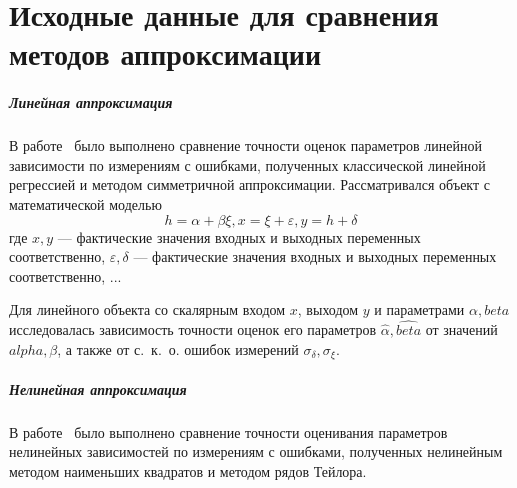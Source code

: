 \chapter{Исходные данные для сравнения методов аппроксимации}

\paragraph*{Линейная аппроксимация}
В работе~\cite{budny17} было выполнено сравнение точности оценок параметров
линейной зависимости по измерениям с ошибками,
полученных классической линейной регрессией и методом симметричной аппроксимации.
Рассматривался объект с математической моделью
\begin{equation}
  \label{eq:linear_model}
  h = \alpha + \beta \xi,
  x = \xi + \varepsilon,
  y = h + \delta
\end{equation}
где
\( x, y \) --- фактические значения входных и выходных переменных соответственно,
\( \varepsilon, \delta \) --- фактические значения входных и выходных переменных соответственно,
...

Для линейного объекта со скалярным входом \( x \), выходом \( y \) и параметрами
\( \alpha, beta \) исследовалась зависимость точности оценок его параметров
\( \hat{\alpha}, \hat{beta} \) от значений \( alpha, \beta \),
а также от с.~к.~о. ошибок измерений \( \sigma_{\delta}, \sigma_{\xi} \).

\paragraph*{Нелинейная аппроксимация}
В работе~\cite{budny15} было выполнено сравнение точности оценивания параметров
нелинейных зависимостей по измерениям с ошибками,
полученных нелинейным методом наименьших квадратов и методом рядов Тейлора.






